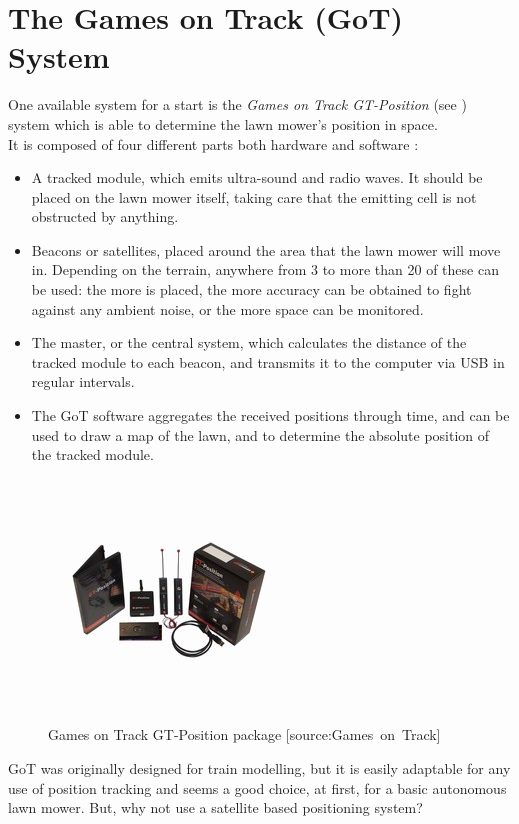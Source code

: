 \section{The Games on Track (GoT) System}
One available system for a start is the \emph{Games on Track GT-Position} (see ) system which is able to determine the lawn mower's position in space.\\
%
It is composed of four different parts both hardware and software \cite{GoTWebsitePos} :
\begin{itemize}
	\item A tracked module, which emits ultra-sound and radio waves. It should be placed on the lawn mower itself, taking care that the emitting cell is not obstructed by anything.
	\item Beacons or satellites, placed around the area that the lawn mower will move in. Depending on the terrain, anywhere from 3 to more than 20 of these can be used: the more is placed, the more accuracy can be obtained to fight against any ambient noise, or the more space can be monitored.
	\item The master, or the central system, which calculates the distance of the tracked module to each beacon, and transmits it to the computer via USB in regular intervals.
	\item The GoT software aggregates the received positions through time, and can be used to draw a map of the lawn, and to determine the absolute position of the tracked module.
\end{itemize}

\begin{figure}[H]
\centering
\includegraphics[scale=1.1]{figures/gotSystem.jpg} 
\caption{Games on Track GT-Position package [source:Games\ on\ Track]} 
\label{fig:GoTsystem}
\end{figure}
\noindent

GoT was originally designed for train modelling, but it is easily adaptable for any use of position tracking and seems a good choice, at first, for a basic autonomous lawn mower.
But, why not use a satellite based positioning system?